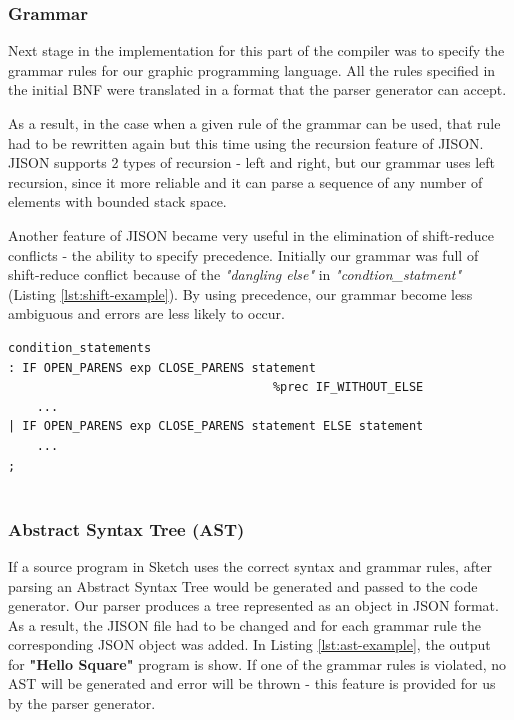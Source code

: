\documentclass{l3proj}
\begin{document}
\subsubsection{Grammar}
Next stage in the implementation for this part of the compiler was to specify the grammar rules for our graphic programming language. All the rules specified in the initial BNF were translated in a format that the parser generator can accept. 

As a result, in the case when a given rule of the grammar can be used, that rule had to be rewritten again  but this time using the recursion feature of JISON. JISON supports 2 types of recursion - left and right, but our grammar uses left recursion, since it more reliable and it can parse a sequence of any number of elements with bounded stack space.


Another feature of JISON became very useful in the elimination of shift-reduce conflicts - the ability to specify precedence. Initially our grammar was full of shift-reduce conflict because of the \textit{"dangling else"}  in \textit{"condtion\_statment"} (Listing \ref{lst:shift-example}). By using precedence, our grammar become less ambiguous and errors are less likely to occur. 

\begin{center}
\lstset{
    basicstyle=\small\ttfamily,
    frame=lrtb,
  }
  

  
  \begin{lstlisting}[caption={condtion\_statments in Sketch after removal of Shift-Reduce conflict },label={lst:shift-example}]
condition_statements
: IF OPEN_PARENS exp CLOSE_PARENS statement
									 %prec IF_WITHOUT_ELSE
    ...
| IF OPEN_PARENS exp CLOSE_PARENS statement ELSE statement
    ...
;
  
  \end{lstlisting}
\end{center}

\subsubsection {Abstract Syntax Tree (AST)}
If a source program in Sketch uses the correct syntax and grammar rules, after parsing an Abstract Syntax Tree would be generated and passed to the code generator. Our parser produces a tree represented as an object in JSON format. As a result, the JISON file had to be changed and for each grammar rule the corresponding JSON object was added. In Listing \ref{lst:ast-example}, the output for \textbf{"Hello Square"} program is show.
If one of the grammar rules is violated, no AST will be generated and error will be thrown - this feature is provided for us by the parser generator.
\end{document}
